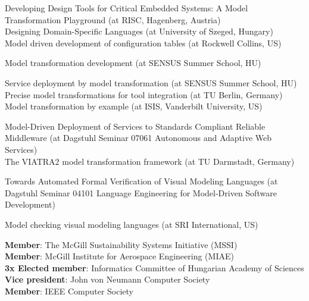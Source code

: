 \documentclass{xetexCV}
\begin{document}
Developing Design Tools for Critical Embedded Systems: A Model Transformation Playground
(at RISC, Hagenberg, Austria) \\

Designing Domain-Specific Languages (at University of Szeged, Hungary)
 \\

Model driven  development of configuration tables (at Rockwell Collins, US)

Model transformation development (at SENSUS Summer School, HU)

Service deployment by model transformation (at SENSUS Summer School, HU)
\\

Precise model transformations for tool integration (at TU Berlin, Germany)
 \\

Model transformation by example (at ISIS, Vanderbilt University, US)

Model-Driven Deployment of Services to Standards Compliant Reliable
Middleware (at Dagstuhl Seminar 07061 Autonomous and Adaptive Web Services)
\\

The VIATRA2 model transformation framework (at TU Darmstadt, Germany)

Towards Automated Formal Verification of Visual Modeling Languages
(at Dagstuhl Seminar 04101 Language Engineering for Model-Driven Software Development) 

Model checking visual modeling languages (at SRI International, US) %

\textbf{Member}:   The McGill Sustainability Systems Initiative (MSSI)\\
\textbf{Member}:   McGill Institute for Aerospace Engineering (MIAE)\\
\textbf{3x Elected member}:  Informatics Committee of Hungarian Academy of Sciences \\
\textbf{Vice president}:  John von Neumann Computer Society \\
\textbf{Member}: IEEE Computer Society 

\newpage

\end{document}
